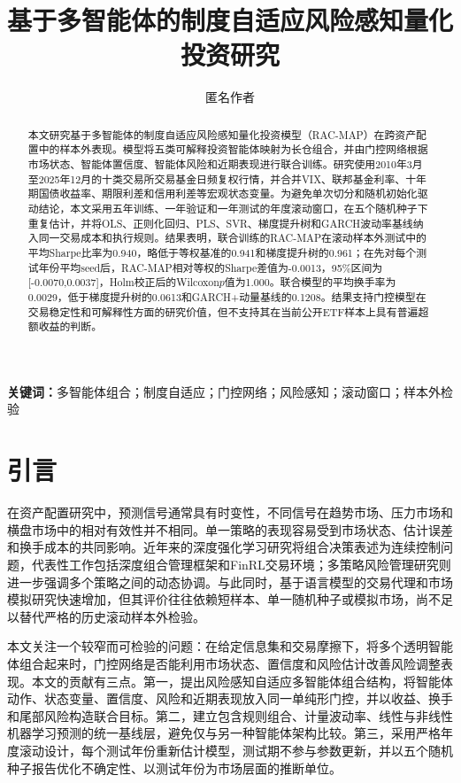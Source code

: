 \documentclass[UTF8,a4paper,zihao=-4]{ctexart}
\title{基于多智能体的制度自适应风险感知量化投资研究}
\author{匿名作者}
\date{}
\begin{document}
\maketitle

\begin{abstract}
本文研究基于多智能体的制度自适应风险感知量化投资模型（RAC-MAP）在跨资产配置中的样本外表现。模型将五类可解释投资智能体映射为长仓组合，并由门控网络根据市场状态、智能体置信度、智能体风险和近期表现进行联合训练。研究使用2010年3月至2025年12月的十类交易所交易基金日频复权行情，并合并VIX、联邦基金利率、十年期国债收益率、期限利差和信用利差等宏观状态变量。为避免单次切分和随机初始化驱动结论，本文采用五年训练、一年验证和一年测试的年度滚动窗口，在五个随机种子下重复估计，并将OLS、正则化回归、PLS、SVR、梯度提升树和GARCH波动率基线纳入同一交易成本和执行规则。结果表明，联合训练的RAC-MAP在滚动样本外测试中的平均Sharpe比率为0.940，略低于等权基准的0.941和梯度提升树的0.961；在先对每个测试年份平均seed后，RAC-MAP相对等权的Sharpe差值为-0.0013，95\%区间为[-0.0070,0.0037]，Holm校正后的Wilcoxon$p$值为1.000。联合模型的平均换手率为0.0029，低于梯度提升树的0.0613和GARCH+动量基线的0.1208。结果支持门控模型在交易稳定性和可解释性方面的研究价值，但不支持其在当前公开ETF样本上具有普遍超额收益的判断。
\end{abstract}

\noindent\textbf{关键词：}多智能体组合；制度自适应；门控网络；风险感知；滚动窗口；样本外检验

\section{引言}
在资产配置研究中，预测信号通常具有时变性，不同信号在趋势市场、压力市场和横盘市场中的相对有效性并不相同。单一策略的表现容易受到市场状态、估计误差和换手成本的共同影响。近年来的深度强化学习研究将组合决策表述为连续控制问题，代表性工作包括深度组合管理框架和FinRL交易环境\cite{JiangXuLiang2017,LiuYangChen2020}；多策略风险管理研究则进一步强调多个策略之间的动态协调\cite{LiTamYeung2024}。与此同时，基于语言模型的交易代理和市场模拟研究快速增加，但其评价往往依赖短样本、单一随机种子或模拟市场，尚不足以替代严格的历史滚动样本外检验。

本文关注一个较窄而可检验的问题：在给定信息集和交易摩擦下，将多个透明智能体组合起来时，门控网络是否能利用市场状态、置信度和风险估计改善风险调整表现。本文的贡献有三点。第一，提出风险感知自适应多智能体组合结构，将智能体动作、状态变量、置信度、风险和近期表现放入同一单纯形门控，并以收益、换手和尾部风险构造联合目标。第二，建立包含规则组合、计量波动率、线性与非线性机器学习预测的统一基线层，避免仅与另一种智能体架构比较。第三，采用严格年度滚动设计，每个测试年份重新估计模型，测试期不参与参数更新，并以五个随机种子报告优化不确定性、以测试年份为市场层面的推断单位。
\end{document}
